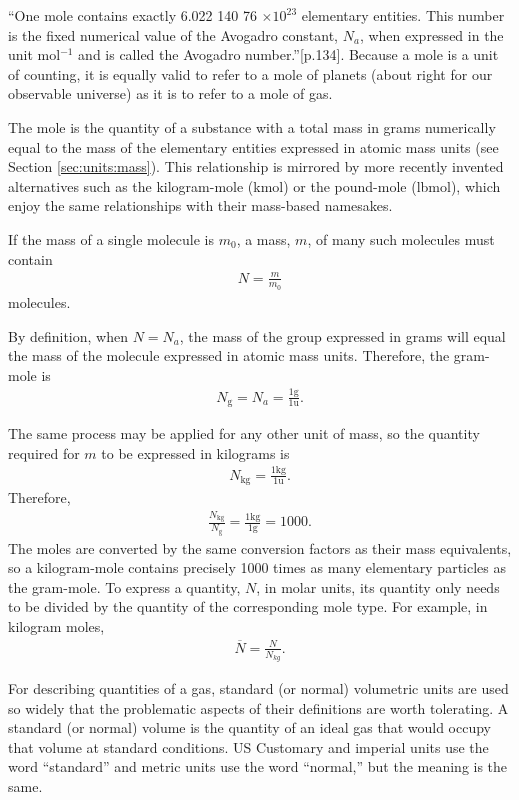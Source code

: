 ``One mole contains exactly 6.022 140 76 $\times 10^{23}$ elementary entities. This number is the fixed numerical value of the Avogadro constant, $N_a$, when expressed in the unit mol$^{-1}$ and is called the Avogadro number.''\cite{si:2019}[p.134].  Because a mole is a unit of counting, it is equally valid to refer to a mole of planets (about right for our observable universe) as it is to refer to a mole of gas.

The mole is the quantity of a substance with a total mass in grams numerically equal to the mass of the elementary entities expressed in atomic mass units (see Section \ref{sec:units:mass}).  This relationship is mirrored by more recently invented alternatives such as the kilogram-mole (kmol) or the pound-mole (lbmol), which enjoy the same relationships with their mass-based namesakes.

If the mass of a single molecule is $m_0$, a mass, $m$, of many such molecules must contain
\begin{align}
N = \frac{m}{m_0}
\end{align}
molecules.

By definition, when $N = N_a$, the mass of the group expressed in grams will equal the mass of the molecule expressed in atomic mass units.  Therefore, the gram-mole is
\begin{align}
N_\mathrm{g} = N_a = \frac{1\mathrm{g}}{1\mathrm{u}}.
\end{align}

The same process may be applied for any other unit of mass, so the quantity required for $m$ to be expressed in kilograms is
\begin{align}
N_\mathrm{kg} = \frac{1\mathrm{kg}}{1\mathrm{u}}.
\end{align}
Therefore,
\begin{align}
\frac{N_\mathrm{kg}}{N_\mathrm{g}} = \frac{1 \mathrm{kg}}{1 \mathrm{g}} = 1000.
\end{align}
The moles are converted by the same conversion factors as their mass equivalents, so a kilogram-mole contains precisely 1000 times as many elementary particles as the gram-mole.  To express a quantity, $N$, in molar units, its quantity only needs to be divided by the quantity of the corresponding mole type.  For example, in kilogram moles,
\begin{align}
\overline{N} = \frac{N}{N_{kg}}.
\end{align}

For describing quantities of a gas, standard (or normal) volumetric units are used so widely that the problematic aspects of their definitions are worth tolerating.  A standard (or normal) volume is the quantity of an ideal gas that would occupy that volume at standard conditions.  US Customary and imperial units use the word ``standard'' and metric units use the word ``normal,'' but the meaning is the same.  

